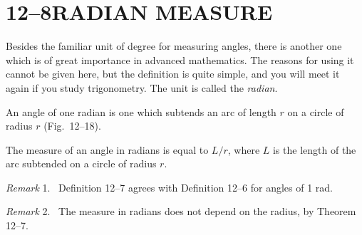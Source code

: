 \documentclass[11pt]{book}
\newenvironment{XIIremarkn}[1]{\par\medskip\noindent\emph{Remark} #1.\ }%
  {\par\medskip}
\begin{document}
\section*{12--8\quad RADIAN MEASURE}

Besides the familiar unit of degree for measuring angles, there is another one
which is of great importance in advanced mathematics. The reasons for using it
cannot be given here, but the definition is quite simple, and you will meet it
again if you study trigonometry. The unit is called the \emph{radian}.

\begin{definition}
An angle of one radian is one which subtends an arc of length $r$ on a circle of
radius $r$ (Fig.~12--18).
\end{definition}

\begin{definition}
The measure of an angle in radians is equal to $L/r$, where $L$ is the length of
the arc subtended on a circle of radius $r$.
\end{definition}

\begin{XIIremarkn}{1}
Definition 12--7 agrees with Definition 12--6 for angles of 1 rad.
\end{XIIremarkn}

\begin{XIIremarkn}{2}
The measure in radians does not depend on the radius, by Theorem 12--7.
\end{XIIremarkn}
\end{document}
